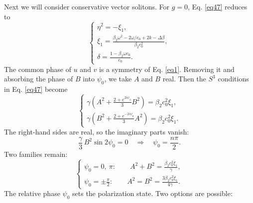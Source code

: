 \documentclass{article}
\begin{document}
            Next we will consider conservative vector solitons.
            For $g=0$, Eq. \ref{eq47} reduces to
            \begin{equation} \label{eq49}
                \begin{cases}
                    \displaystyle \eta^2 = -\xi_1, \\
                    \displaystyle \xi_1 = \frac{\beta_2\omega^2 - 2\omega/c_0 + 2k - \Delta\beta}{\beta_2c_0^2}, \\
                    \displaystyle \delta = \frac{1-\beta_2\omega c_0}{c_0}.
                \end{cases}
            \end{equation}
            The common phase of $u$ and $v$ is a symmetry of Eq. \ref{eq1}. Removing it and absorbing the phase of $B$ into $\psi_{0}$, we take $A$ and $B$ real. Then the $S^3$ conditions in Eq. \ref{eq47} become
            \begin{equation} \label{eq50}
                \begin{cases}
                    \displaystyle \gamma\left(A^2+\frac{2+e^{2i\psi_{0}}}{3}B^2\right) = \beta_2c_0^2\xi_1, \\
                    \displaystyle \gamma\left(B^2+\frac{2+e^{-2i\psi_{0}}}{3}A^2\right) = \beta_2c_0^2\xi_1.
                \end{cases}
            \end{equation}
            The right-hand sides are real, so the imaginary parts vanish:
            \begin{equation} \label{eq51}
                \frac{\gamma}{3}\,B^2\sin 2\psi_{0} = 0 \quad\Rightarrow\quad \psi_{0} = \frac{n\pi}{2}.
            \end{equation}
            Two families remain:
            \begin{equation} \label{eq52}
                \begin{cases}
                    \displaystyle \psi_{0} = 0,\ \pi: \qquad A^2+B^2 = \frac{\beta_2c_0^2\xi_1}{\gamma}, \\
                    \displaystyle \psi_{0} = \pm\frac{\pi}{2}: \qquad A^2 = B^2 = \frac{3\beta_2c_0^2\xi_1}{4\gamma}.
                \end{cases}
            \end{equation}
            The relative phase $\psi_{0}$ sets the polarization state. Two options are possible:
\end{document}
